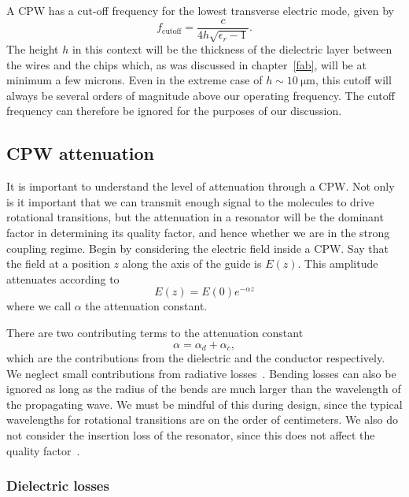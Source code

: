 A CPW has a cut-off frequency for the lowest transverse electric mode, given
by~\cite{Simons2004}
%
\begin{equation}
  f_\text{cutoff} = \frac{c}{4h\sqrt{\epsilon_r - 1}}.
\end{equation}
%
The height $h$ in this context will be the thickness of the dielectric layer
between the wires and the chips which, as was discussed in chapter~\ref{fab},
will be at minimum a few microns.  Even in the extreme case of
$h\sim\SI{10}{\micro\meter}$, this cutoff will always be several orders of
magnitude above our operating frequency.  The cutoff frequency can therefore be
ignored for the purposes of our discussion.

\subsection{CPW attenuation}

It is important to understand the level of attenuation through a CPW. Not only
is it important that we can transmit enough signal to the molecules to drive 
rotational transitions, but the attenuation in a resonator will be the dominant
factor in determining its quality factor, and hence whether we are in the
strong coupling regime. Begin by considering the electric field inside a CPW.
Say that the field at a position $z$ along the axis of the guide is $E(z)$.
This amplitude attenuates according to
%
\begin{equation}
  E(z) = E(0)e^{-\alpha z}
\end{equation}
%
where we call $\alpha$ the attenuation constant.

There are two contributing terms to the attenuation constant
%
\begin{equation}
  \alpha = \alpha_d + \alpha_c,
\end{equation}
%
which are the contributions from the dielectric and the conductor respectively. We
neglect small contributions from radiative losses~\cite{Frankel1991}. Bending
losses can also be ignored as long as the radius of the bends are much larger
than the wavelength of the propagating wave. We must be mindful of this during
design, since the typical wavelengths for rotational transitions are on the
order of centimeters.  We also do not consider the insertion loss of the
resonator, since this does not affect the quality
factor~\cite{doi:10.1063/1.3010859}.

\subsubsection{Dielectric losses}

